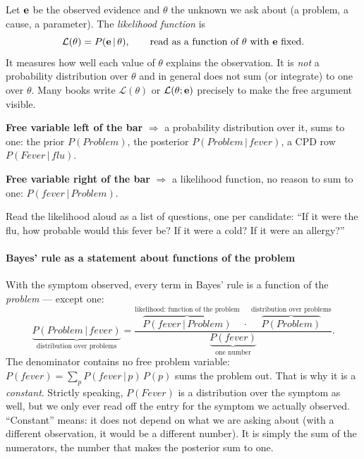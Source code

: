 \documentclass[11pt, oneside]{book}
\newcommand{\Prob}{\mathbb{P}}           %
\newcommand{\given}{\,\vert\,}           %
\newcommand{\vn}[1]{\mathit{#1}}         %
\begin{document}
\begin{defbox}[title={Likelihood function}]
Let $\mathbf{e}$ be the observed evidence and $\theta$ the unknown we ask about (a
problem, a cause, a parameter). The \emph{likelihood function} is
\[
\mathcal{L}(\theta) = P(\be \given \theta), \qquad \text{read as a function of } \theta \text{ with } \be \text{ fixed.}
\]
It measures how well each value of $\theta$ explains the observation. It is
\emph{not} a probability distribution over $\theta$ and in general does not sum
(or integrate) to one over $\theta$. Many books write $\mathcal{L}(\theta)$ or
$\mathcal{L}(\theta; \mathbf{e})$ precisely to make the free argument visible.
\end{defbox}

\begin{intbox}[title={Which side is free?}, unbreakable]
\textbf{Free variable left of the bar} $\Rightarrow$ a probability
distribution over it, sums to one: the prior $P(\vn{Problem})$, the posterior
$P(\vn{Problem} \given \vn{fever})$, a CPD row $P(\vn{Fever} \given
\vn{flu})$.\par
\textbf{Free variable right of the bar} $\Rightarrow$ a likelihood function,
no reason to sum to one: $P(\vn{fever} \given \vn{Problem})$.\par\smallskip
Read the likelihood aloud as a list of questions, one per candidate: ``If it
were the flu, how probable would this fever be? If it were a cold? If it were an
allergy?''
\end{intbox}

\paragraph{Bayes' rule as a statement about functions of the problem} With the
symptom observed, every term in Bayes' rule is a function of the
\emph{problem} --- except one:
\[
\underbrace{P(\vn{Problem} \given \vn{fever})}_{\text{distribution over problems}}
= \frac{\overbrace{P(\vn{fever} \given \vn{Problem})}^{\text{likelihood: function of the problem}}
        \;\cdot\; \overbrace{P(\vn{Problem})}^{\text{distribution over problems}}}
       {\underbrace{P(\vn{fever})}_{\text{one number}}} .
\]
The denominator contains no free problem variable: $P(\vn{fever}) =
\sum_{p} P(\vn{fever} \given p)\, P(p)$ sums the problem out. That is why it is
a \emph{constant}. Strictly speaking, $P(\vn{Fever})$ is a distribution over
the symptom as well, but we only ever read off the entry for the symptom we
actually observed. ``Constant'' means: it does not depend on what we are asking
about (with a different observation, it would be a different number). It is
simply the sum of the numerators, the number that makes the posterior sum to
one.
\end{document}

